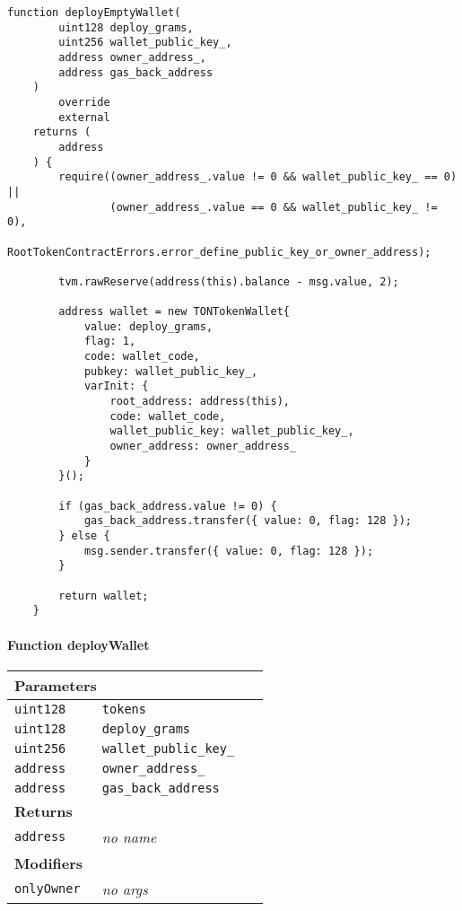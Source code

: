 \begin{lstlisting}[firstnumber=237]
    function deployEmptyWallet(
        uint128 deploy_grams,
        uint256 wallet_public_key_,
        address owner_address_,
        address gas_back_address
    )
        override
        external
    returns (
        address
    ) {
        require((owner_address_.value != 0 && wallet_public_key_ == 0) ||
                (owner_address_.value == 0 && wallet_public_key_ != 0),
                RootTokenContractErrors.error_define_public_key_or_owner_address);

        tvm.rawReserve(address(this).balance - msg.value, 2);

        address wallet = new TONTokenWallet{
            value: deploy_grams,
            flag: 1,
            code: wallet_code,
            pubkey: wallet_public_key_,
            varInit: {
                root_address: address(this),
                code: wallet_code,
                wallet_public_key: wallet_public_key_,
                owner_address: owner_address_
            }
        }();

        if (gas_back_address.value != 0) {
            gas_back_address.transfer({ value: 0, flag: 128 });
        } else {
            msg.sender.transfer({ value: 0, flag: 128 });
        }

        return wallet;
    }
\end{lstlisting}

\paragraph{Function deployWallet}


\ifsoltables
\noindent\begin{tabular}{|l|l|p{5cm}|}\hline
\multicolumn{3}{|l|}{\bf Parameters}\\\hline
\tt uint128 & \tt tokens &\\\hline
\tt uint128 & \tt deploy\_{}grams &\\\hline
\tt uint256 & \tt wallet\_{}public\_{}key\_{} &\\\hline
\tt address & \tt owner\_{}address\_{} &\\\hline
\tt address & \tt gas\_{}back\_{}address &\\\hline
\multicolumn{3}{|l|}{\bf Returns}\\\hline
\tt address & {\em no name} &\\\hline
\multicolumn{3}{|l|}{\bf Modifiers}\\\hline
\tt onlyOwner & {\em no args} &\\\hline
\end{tabular}
\fi

